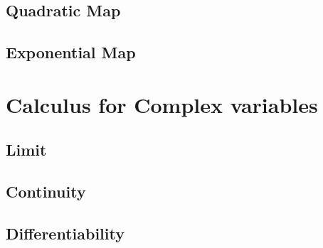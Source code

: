 \subsection{Quadratic Map}

\subsection{Exponential Map}


\section{Calculus for Complex variables}

\subsection{Limit}

\subsection{Continuity}

\subsection{Differentiability}
